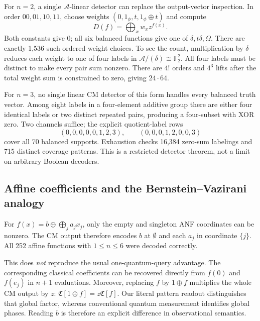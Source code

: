 \documentclass[11pt,a4paper]{article}
\theoremstyle{definition}\newtheorem{definition}[theorem]{Definition}
\theoremstyle{remark}\newtheorem{remark}[theorem]{Remark}
\newcommand{\F}{\mathbb F}
\newcommand{\alg}{\mathcal A}
\newcommand{\one}{1_{\phi}}
\numberwithin{equation}{section}
\begin{document}
For $n=2$, a single $\alg$-linear detector can replace the output-vector inspection. In order $00,01,10,11$, choose weights $(0,\one,t,\one\oplus t)$ and compute
\begin{equation}
 D(f)=\bigoplus_x w_x z^{f(x)}.
\end{equation}
Both constants give 0; all six balanced functions give one of $\delta,t\delta,\Omega$. There are exactly 1,536 such ordered weight choices. To see the count, multiplication by $\delta$ reduces each weight to one of four labels in $\alg/(\delta)\cong\F_2^2$. All four labels must be distinct to make every pair sum nonzero. There are $4!$ orders and $4^3$ lifts after the total weight sum is constrained to zero, giving $24\cdot64$.

For $n=3$, no single linear CM detector of this form handles every balanced truth vector. Among eight labels in a four-element additive group there are either four identical labels or two distinct repeated pairs, producing a four-subset with XOR zero. Two channels suffice; the explicit quotient-label rows
\begin{equation}
 (0,0,0,0,0,1,2,3),\qquad(0,0,0,1,2,0,0,3)
\end{equation}
cover all 70 balanced supports. Exhaustion checks 16,384 zero-sum labelings and 715 distinct coverage patterns. This is a restricted detector theorem, not a limit on arbitrary Boolean decoders.

\subsection{Affine coefficients and the Bernstein--Vazirani analogy}
For $f(x)=b\oplus\bigoplus_j a_jx_j$, only the empty and singleton ANF coordinates can be nonzero. The CM output therefore encodes $b$ at $\emptyset$ and each $a_j$ in coordinate $\{j\}$. All 252 affine functions with $1\le n\le6$ were decoded correctly.

This does \emph{not} reproduce the usual one-quantum-query advantage. The corresponding classical coefficients can be recovered directly from $f(0)$ and $f(e_j)$ in $n+1$ evaluations. Moreover, replacing $f$ by $1\oplus f$ multiplies the whole CM output by $z$: $\mathfrak C[1\oplus f]=z\mathfrak C[f]$. Our literal pattern readout distinguishes that global factor, whereas conventional quantum measurement identifies global phases. Reading $b$ is therefore an explicit difference in observational semantics.
\end{document}
